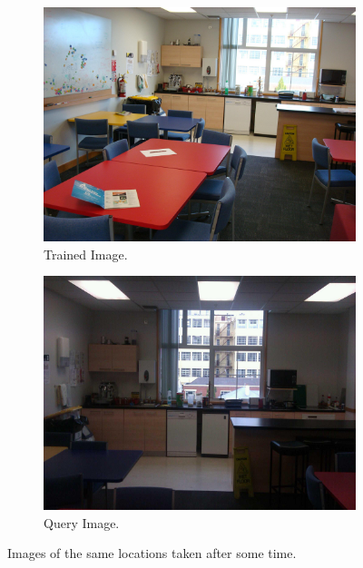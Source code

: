 \begin{enumerate}
\begin{figure}[h!]
\centering
        \begin{subfigure}[b]{0.40\textwidth}
                \centering
                \includegraphics[width=\textwidth]{images/cr_1.png}
                \caption{Trained Image.}
        \end{subfigure}
        \begin{subfigure}[b]{0.40\textwidth}
                \centering
                \includegraphics[width=\textwidth]{images/cr_2.png}
                \caption{Query Image.}
        \end{subfigure}
      \caption{Images of the same locations taken after some time.}
 \label{fig:changes} 
\end{figure}



\end{enumerate}
